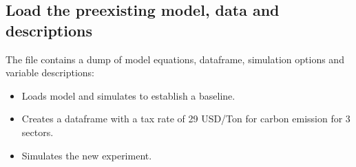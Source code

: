 \documentclass[letterpaper,10pt,english]{jupyterBook}
\begin{document}
\subsection{Load the pre\sphinxhyphen{}existing model, data and descriptions}
\label{\detokenize{content/06_ModelAnalytics/Attribution:load-the-pre-existing-model-data-and-descriptions}}
\sphinxAtStartPar
The file  contains a dump of model equations, dataframe, simulation options and variable descriptions:
\begin{itemize}
\item {} 
\sphinxAtStartPar
Loads model and simulates to establish a baseline.

\item {} 
\sphinxAtStartPar
Creates a dataframe with a tax rate of 29 USD/Ton for carbon emission for 3 sectors.

\item {} 
\sphinxAtStartPar
Simulates the new experiment.

\end{itemize}
\end{document}
